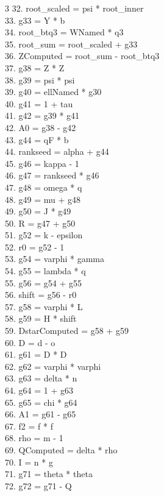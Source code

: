 \documentclass[10pt]{article}
\begin{document}
\begin{multicols}{3}
32. root\_scaled = psi * root\_inner\\
33. g33 = Y * b\\
34. root\_btq3 = WNamed * q3\\
35. root\_sum = root\_scaled + g33\\
36. ZComputed = root\_sum - root\_btq3\\
37. g38 = Z * Z\\
38. g39 = psi * psi\\
39. g40 = ellNamed * g30\\
40. g41 = 1 + tau\\
41. g42 = g39 * g41\\
42. A0 = g38 - g42\\
43. g44 = qF * b\\
44. rankseed = alpha + g44\\
45. g46 = kappa - 1\\
46. g47 = rankseed * g46\\
47. g48 = omega * q\\
48. g49 = mu + g48\\
49. g50 = J * g49\\
50. R = g47 + g50\\
51. g52 = k - epsilon\\
52. r0 = g52 - 1\\
53. g54 = varphi * gamma\\
54. g55 = lambda * q\\
55. g56 = g54 + g55\\
56. shift = g56 - r0\\
57. g58 = varphi * L\\
58. g59 = H * shift\\
59. DstarComputed = g58 + g59\\
60. D = d - o\\
61. g61 = D * D\\
62. g62 = varphi * varphi\\
63. g63 = delta * n\\
64. g64 = 1 + g63\\
65. g65 = chi * g64\\
66. A1 = g61 - g65\\
67. f2 = f * f\\
68. rho = m - 1\\
69. QComputed = delta * rho\\
70. I = n * g\\
71. g71 = theta * theta\\
72. g72 = g71 - Q\\

\end{multicols}
\end{document}
